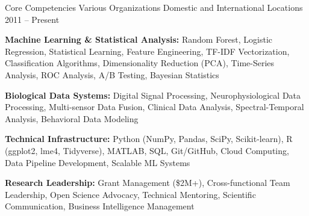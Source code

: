 
\begin{cventries}

    \cventry
    {Core Competencies}
    {Various Organizations}
    {Domestic and International Locations}
    {2011 -- Present}
    {
      \begin{cvitems}
        \item \textbf{Machine Learning \& Statistical Analysis:} Random Forest, Logistic Regression, Statistical Learning, Feature Engineering, TF-IDF Vectorization, Classification Algorithms, Dimensionality Reduction (PCA), Time-Series Analysis, ROC Analysis, A/B Testing, Bayesian Statistics
        \item \textbf{Biological Data Systems:} Digital Signal Processing, Neurophysiological Data Processing, Multi-sensor Data Fusion, Clinical Data Analysis, Spectral-Temporal Analysis, Behavioral Data Modeling
        \item \textbf{Technical Infrastructure:} Python (NumPy, Pandas, SciPy, Scikit-learn), R (ggplot2, lme4, Tidyverse), MATLAB, SQL, Git/GitHub, Cloud Computing, Data Pipeline Development, Scalable ML Systems
        \item \textbf{Research Leadership:} Grant Management (\$2M+), Cross-functional Team Leadership, Open Science Advocacy, Technical Mentoring, Scientific Communication, Business Intelligence Management
      \end{cvitems}
    }


\end{cventries}
